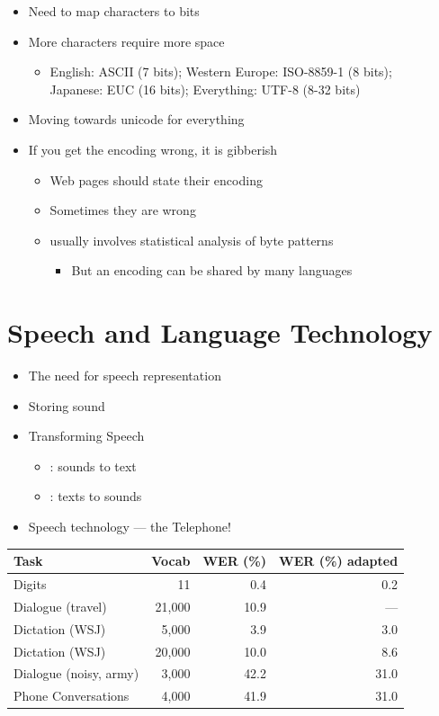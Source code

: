 \documentclass[a4paper,landscape,headrule,footrule,xetex]{foils}
\begin{document}
\begin{itemize}
\item Need to map characters to bits
\item More characters require more space
  \begin{itemize}
  \item English: ASCII (7 bits); Western Europe: ISO-8859-1 (8 bits); 
    \\ Japanese: EUC (16 bits); Everything: UTF-8 (8-32 bits)
  \end{itemize}
\item Moving towards unicode for everything
\item If you get the encoding wrong, it is gibberish
  \begin{itemize}
  \item Web pages should state their encoding
  \item Sometimes they are wrong
  \item {}  usually involves statistical analysis of byte patterns
    \begin{itemize}
    \item But an encoding can be shared by many languages
    \end{itemize}
  \end{itemize}
\end{itemize}




\section{Speech and Language Technology}

\begin{itemize}
\item The need for speech representation
\item Storing sound
\item Transforming Speech
  \begin{itemize}
  \item {}: sounds to text
  \item {}: texts to sounds
  \end{itemize}
\item Speech technology --- the Telephone!
\end{itemize}



  \begin{tabular}{lrrr}
    Task & Vocab & WER (\%) & WER  (\%) adapted \\ \hline
    Digits & 11 & 0.4 & 0.2 \\
    Dialogue (travel) & 21,000 & 10.9 & --- \\
    Dictation (WSJ) & 5,000 & 3.9 & 3.0 \\
    Dictation (WSJ) & 20,000 & 10.0 & 8.6 \\
    Dialogue (noisy, army) & 3,000 & 42.2 & 31.0 \\
    Phone Conversations & 4,000 & 41.9 & 31.0 \\
  \end{tabular}
\end{document}
